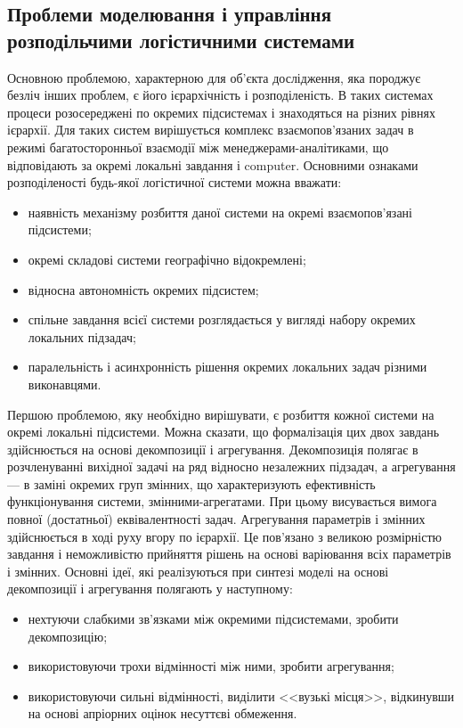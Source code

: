 \subsection{Проблеми моделювання і управління розподільчими логістичними системами}
Основною проблемою, характерною для об'єкта дослідження, яка породжує безліч інших проблем, є його ієрархічність і розподіленість.
В таких системах процеси розосереджені по окремих підсистемах і знаходяться на різних рівнях ієрархії.
Для таких систем вирішується комплекс взаємопов'язаних задач в режимі багатосторонньої взаємодії між менеджерами-аналітиками, що відповідають за окремі локальні завдання і \acrshort{computer}.
Основними ознаками розподіленості будь-якої логістичної системи можна вважати:
\begin{itemize}
	\item наявність механізму розбиття даної системи на окремі взаємопов'язані підсистеми;
	\item окремі складові системи географічно відокремлені;
	\item відносна автономність окремих підсистем;
	\item спільне завдання всієї системи розглядається у вигляді набору окремих локальних підзадач;
	\item паралельність і асинхронність рішення окремих локальних задач різними виконавцями.
\end{itemize}

Першою проблемою, яку необхідно вирішувати, є розбиття кожної системи на окремі локальні підсистеми.
Можна сказати, що формалізація цих двох завдань здійснюється на основі декомпозиції і агрегування.
Декомпозиція полягає в розчленуванні вихідної задачі на ряд відносно незалежних підзадач, а агрегування --- в заміні окремих груп змінних, що характеризують ефективність функціонування системи, змінними-агрегатами.
При цьому висувається вимога повної (достатньої) еквівалентності задач.
Агрегування параметрів і змінних здійснюється в ході руху вгору по ієрархії.
Це пов'язано з великою розмірністю завдання і неможливістю прийняття рішень на основі варіювання всіх параметрів і змінних.
Основні ідеї, які реалізуються при синтезі моделі на основі декомпозиції і агрегування полягають у наступному:
\begin{itemize}
	\item нехтуючи слабкими зв'язками між окремими підсистемами, зробити декомпозицію;
	\item використовуючи трохи відмінності між ними, зробити агрегування;
	\item використовуючи сильні відмінності, виділити <<вузькі місця>>, відкинувши на основі апріорних оцінок несуттєві обмеження.
\end{itemize}

